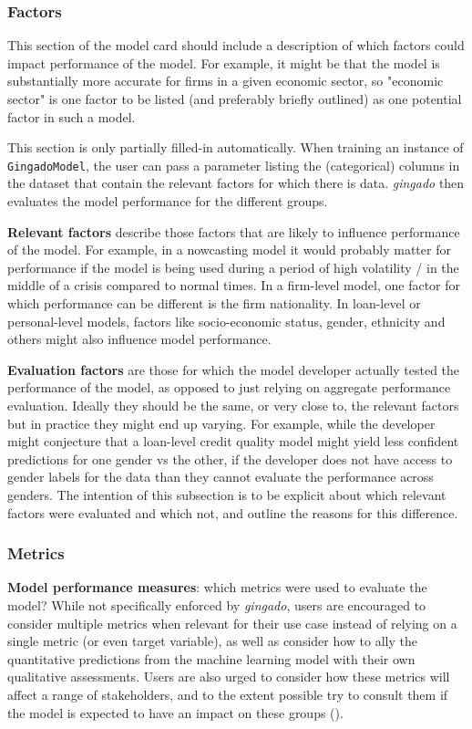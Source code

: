 \documentclass{article}
\begin{document}
\subsubsection{Factors}
This section of the model card should include a description of which factors could impact performance of the model. For example, it might be that the model is substantially more accurate for firms in a given economic sector, so "economic sector" is one factor to be listed (and preferably briefly outlined) as one potential factor in such a model.

This section is only partially filled-in automatically. When training an instance of \texttt{GingadoModel}, the user can pass a parameter listing the (categorical) columns in the dataset that contain the relevant factors for which there is data. \textit{gingado} then evaluates the model performance for the different groups.

\textbf{Relevant factors} describe those factors that are likely to influence performance of the model. For example, in a nowcasting model it would probably matter for performance if the model is being used during a period of high volatility / in the middle of a crisis compared to normal times. In a firm-level model, one factor for which performance can be different is the firm nationality. In loan-level or personal-level models, factors like socio-economic status, gender, ethnicity and others might also influence model performance.

\textbf{Evaluation factors} are those for which the model developer actually tested the performance of the model, as opposed to just relying on aggregate performance evaluation. Ideally they should be the same, or very close to, the relevant factors but in practice they might end up varying. For example, while the developer might conjecture that a loan-level credit quality model might yield less confident predictions for one gender vs the other, if the developer does not have access to gender labels for the data than they cannot evaluate the performance across genders. The intention of this subsection is to be explicit about which relevant factors were evaluated and which not, and outline the reasons for this difference.

\subsubsection{Metrics}
\textbf{Model performance measures}: which metrics were used to evaluate the model? While not specifically enforced by \textit{gingado}, users are encouraged to consider multiple metrics when relevant for their use case instead of relying on a single metric (or even target variable), as well as consider how to ally the quantitative predictions from the machine learning model with their own qualitative assessments. Users are also urged to consider how these metrics will affect a range of stakeholders, and to the extent possible try to consult them if the model is expected to have an impact on these groups (\cite{problemmetrics}).
\end{document}
